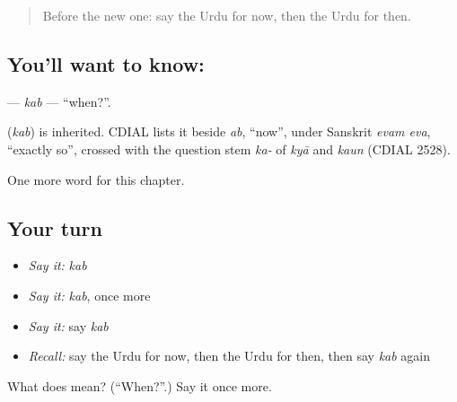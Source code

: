 \label{lesson:UR-C93-kab}



\begin{quote}
Before the new one: say the Urdu for now, then the Urdu for then.
\end{quote}

\subsection*{You'll want to know: }
\textbf{} — \emph{kab} — \textquotedblleft{}when?\textquotedblright{}.

\begin{cousinweb}
\textbf{} (\emph{kab}) is inherited. CDIAL lists it beside \emph{ab}, \textquotedblleft{}now\textquotedblright{}, under Sanskrit \emph{evam eva}, \textquotedblleft{}exactly so\textquotedblright{}, crossed with the question stem \emph{ka-} of \emph{kyā} and \emph{kaun} (CDIAL 2528).
\end{cousinweb}

\begin{grammarlens}[title={What you've built}]
One more word for this chapter.
\end{grammarlens}

\subsection*{Your turn}
\begin{itemize}
\raggedright
  \item \emph{Say it:} \emph{kab}
  \item \emph{Say it:} \emph{kab}, once more
  \item \emph{Say it:} say \emph{kab}
  \item \emph{Recall:} say the Urdu for now, then the Urdu for then, then say \emph{kab} again
\end{itemize}

\begin{tcolorbox}[breakable,colback=teal!4,colframe=teal!35!black,title={Before you move on}]
What does  mean? (\textquotedblleft{}When?\textquotedblright{}.) Say it once more.
\end{tcolorbox}
